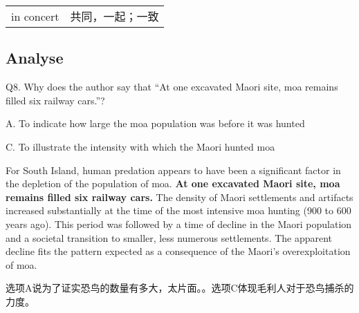 \begin{tabular}{ll}
    in concert & 共同，一起；一致 \\
\end{tabular}

\newpage

\subsection{Analyse}

\begin{blk}
    \begin{qst}
        Q8. Why does the author say that “At one excavated Maori site, moa remains filled six railway cars.”?
    \end{qst}

    \begin{chc}
        A. To indicate how large the moa population was before it was hunted

        C. To illustrate the intensity with which the Maori hunted moa
    \end{chc}

    \begin{psgq}
        For South Island, human predation appears to have been a significant factor in the depletion of the population of moa. \textbf{At one excavated Maori site, moa remains filled six railway cars.} The density of Maori settlements and artifacts increased substantially at the time of the most intensive moa hunting (900 to 600 years ago). This period was followed by a time of decline in the Maori population and a societal transition to smaller, less numerous settlements. The apparent decline fits the pattern expected as a consequence of the Maori’s overexploitation of moa.
    \end{psgq}

    \begin{nlz}
        选项A说为了证实恐鸟的数量有多大，太片面。。选项C体现毛利人对于恐鸟捕杀的力度。
    \end{nlz}
\end{blk}

\newpage